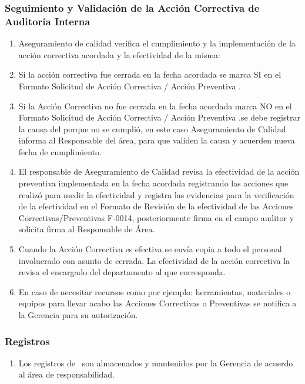 \subsubsection{Seguimiento y Validación de la Acción Correctiva de Auditoría Interna}
\begin{enumerate}
	\item Aseguramiento de calidad verifica el cumplimiento y la implementación de la acción correctiva acordada y la efectividad de la misma:
	\item Si la acción correctiva fue cerrada en la fecha acordada se marca SI en el Formato Solicitud de Acción Correctiva / Acción Preventiva \RAC.
	\item Si la Acción Correctiva no fue cerrada en la fecha acordada marca NO en el Formato Solicitud de Acción Correctiva / Acción Preventiva \RAC.se debe registrar la causa del porque no se cumplió, en este caso Aseguramiento de Calidad informa al Responsable del área, para que validen la causa y acuerden nueva fecha de cumplimiento.
	\item El responsable de Aseguramiento de Calidad revisa la efectividad de la acción preventiva implementada en la fecha acordada registrando las acciones que realizó para medir la efectividad y registra las evidencias para la verificación de la efectividad en el Formato de Revisión de la efectividad de las Acciones Correctivas/Preventivas F-0014, posteriormente firma en el campo auditor y solicita firma al Responsable de Área.
	\item Cuando la Acción Correctiva es efectiva se envía copia a todo el personal involucrado con asunto de cerrada. La efectividad de la acción correctiva la revisa el encargado del departamento al que corresponda.
	\item En caso de necesitar recursos como por ejemplo: herramientas, materiales o equipos para llevar acabo las Acciones Correctivas o Preventivas se notifica a la Gerencia para su autorización.
\end{enumerate}

\subsubsection{Registros}
\begin{enumerate}
	\item Los registros de \RAC~son almacenados y mantenidos por la Gerencia de acuerdo al área de responsabilidad.
\end{enumerate}

